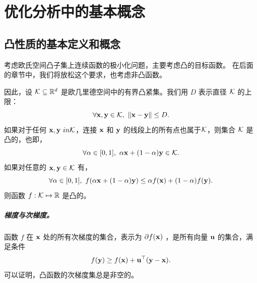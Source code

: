 \chapter{
    优化分析中的基本概念
    }  \label{chap:opt}

\section{
    凸性质的基本定义和概念
    }  \label{sec:optdefs}


考虑欧氏空间凸子集上连续函数的极小化问题，主要考虑凸的目标函数。
在后面的章节中，我们将放松这个要求，也考虑非凸函数。

因此，设 $\mathcal K \subseteq {\mathbb R}^d$ 是欧几里德空间中的有界凸紧集。我们用 $D$ 表示直径 $\mathcal K$ 的上限： 
$$ \forall \mathbf x,\mathbf y \in \mathcal K , \ \|\mathbf x-\mathbf y\| \leq D.$$
如果对于任何 $\mathbf x, \mathbf y\ in \mathcal K$，连接 $\mathbf x$ 和 $\mathbf y$ 的线段上的所有点也属于$\mathcal K$，则集合 $\mathcal K$ 是凸的，也即， 
$$ \forall \alpha \in [0,1]  , \ \alpha \mathbf x + (1-\alpha)\mathbf y \in \mathcal K.$$
如果对任意的 $\mathbf x,\mathbf y \in \mathcal K$ 有，
$$\forall \alpha \in [0,1] , \  f(  \alpha \mathbf x + (1-\alpha) \mathbf y) \leq  \alpha f(\mathbf x) + (1-\alpha) f(\mathbf y).$$
则函数  $f: \mathcal K \mapsto {\mathbb R}$ 是凸的。

\paragraph{
    梯度与次梯度。
    }
    
 函数 $f$ 在 $\mathbf x$ 处的所有次梯度的集合，表示为 $\partial f(\mathbf x)$ ，是所有向量 $\mathbf u$ 的集合，满足条件 
$$ f(\mathbf y) \geq  f(\mathbf x) + \mathbf u^\top (\mathbf y-\mathbf x) . $$  
可以证明，凸函数的次梯度集总是非空的。 

